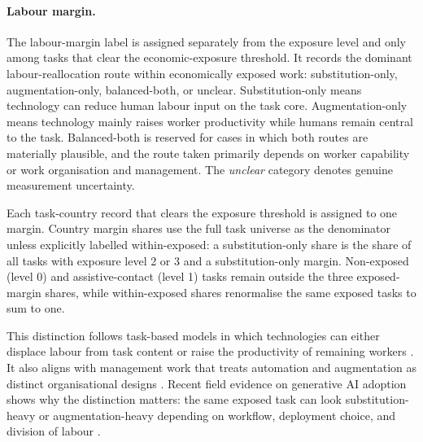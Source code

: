 \documentclass[11pt]{article}
\begin{document}
\paragraph{Labour margin.} The labour-margin label is assigned separately from the exposure level and only among tasks that clear the economic-exposure threshold. It records the dominant labour-reallocation route within economically exposed work: substitution-only, augmentation-only, balanced-both, or unclear. Substitution-only means technology can reduce human labour input on the task core. Augmentation-only means technology mainly raises worker productivity while humans remain central to the task. Balanced-both is reserved for cases in which both routes are materially plausible, and the route taken primarily depends on worker capability or work organisation and management. The \textit{unclear} category denotes genuine measurement uncertainty.

Each task-country record that clears the exposure threshold is assigned to one margin. Country margin shares use the full task universe as the denominator unless explicitly labelled within-exposed: a substitution-only share is the share of all tasks with exposure level 2 or 3 and a substitution-only margin. Non-exposed (level 0) and assistive-contact (level 1) tasks remain outside the three exposed-margin shares, while within-exposed shares renormalise the same exposed tasks to sum to one.

This distinction follows task-based models in which technologies can either displace labour from task content or raise the productivity of remaining workers \citep{AcemogluRestrepo2018}. It also aligns with management work that treats automation and augmentation as distinct organisational designs \citep{RaischKrakowski2021AutomationAugmentation}. Recent field evidence on generative AI adoption shows why the distinction matters: the same exposed task can look substitution-heavy or augmentation-heavy depending on workflow, deployment choice, and division of labour \citep{BrynjolfssonLiRaymond2023GenerativeAIatWork,NoyZhang2023ProductivityEffectsGenAI}.
\end{document}
